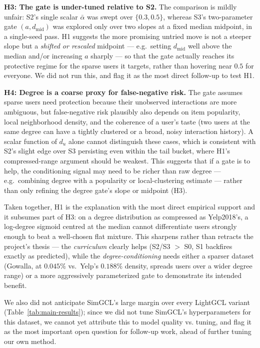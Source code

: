 \documentclass{article}
\begin{document}
\textbf{H3: The gate is under-tuned relative to S2.} The comparison is mildly unfair:
S2's single scalar $\bar\alpha$ was swept over $\{0.3,0.5\}$, whereas S3's two-parameter
gate $(a,d_{\mathrm{mid}})$ was explored only over two slopes at a fixed median
midpoint, in a single-seed pass. H1 suggests the more promising untried move is not a
steeper slope but a \emph{shifted or rescaled} midpoint --- e.g.\ setting
$d_{\mathrm{mid}}$ well above the median and/or increasing $a$ sharply --- so that the
gate actually reaches its protective regime for the sparse users it targets, rather
than hovering near $0.5$ for everyone. We did not run this, and flag it as the most
direct follow-up to test H1.

\textbf{H4: Degree is a coarse proxy for false-negative risk.} The gate assumes sparse
users need protection because their unobserved interactions are more ambiguous, but
false-negative risk plausibly also depends on item popularity, local neighborhood
density, and the coherence of a user's taste (two users at the same degree can have a
tightly clustered or a broad, noisy interaction history). A scalar function of $d_u$
alone cannot distinguish these cases, which is consistent with S2's slight edge over S3
persisting even within the tail bucket, where H1's compressed-range argument should be
weakest. This suggests that if a gate is to help, the conditioning signal may need to be
richer than raw degree --- e.g.\ combining degree with a popularity or local-clustering
estimate --- rather than only refining the degree gate's slope or midpoint (H3).

Taken together, H1 is the explanation with the most direct empirical support and it
subsumes part of H3: on a degree distribution as compressed as Yelp2018's, a
log-degree sigmoid centred at the median cannot differentiate users strongly enough to
beat a well-chosen flat mixture. This sharpens rather than retracts the project's
thesis --- the \emph{curriculum} clearly helps (S2/S3 $>$ S0, S1 backfires exactly as
predicted), while the \emph{degree-conditioning} needs either a sparser dataset
(Gowalla, at $0.045\%$ vs.\ Yelp's $0.188\%$ density, spreads users over a wider degree
range) or a more aggressively parameterized gate to demonstrate its intended benefit.

We also did not anticipate SimGCL's large margin over every LightGCL variant
(Table~\ref{tab:main-results}); since we did not tune SimGCL's hyperparameters for this
dataset, we cannot yet attribute this to model quality vs. tuning, and flag it as the
most important open question for follow-up work, ahead of further tuning our own method.
\end{document}
